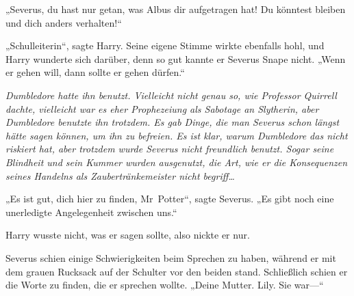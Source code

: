 „Severus, du hast nur getan, was Albus dir aufgetragen hat! Du könntest bleiben und dich anders verhalten!“

„Schulleiterin“, sagte Harry.
Seine eigene Stimme wirkte ebenfalls hohl, und Harry wunderte sich darüber, denn so gut kannte er Severus Snape nicht.
„Wenn er gehen will, dann sollte er gehen dürfen.“

\emph{Dumbledore hatte ihn benutzt. Vielleicht nicht genau so, wie Professor Quirrell dachte, vielleicht war es eher Prophezeiung als Sabotage an Slytherin, aber Dumbledore benutzte ihn trotzdem. Es gab Dinge, die man Severus schon längst hätte sagen können, um ihn zu befreien. Es ist klar, warum Dumbledore das nicht riskiert hat, aber trotzdem wurde Severus nicht freundlich benutzt. Sogar seine Blindheit und sein Kummer wurden ausgenutzt, die Art, wie er die Konsequenzen seines Handelns als Zaubertränkemeister nicht begriff…}

„Es ist gut, dich hier zu finden, Mr~Potter“, sagte Severus. „Es gibt noch eine unerledigte Angelegenheit zwischen uns.“

Harry wusste nicht, was er sagen sollte, also nickte er nur.

Severus schien einige Schwierigkeiten beim Sprechen zu haben, während er mit dem grauen Rucksack auf der Schulter vor den beiden stand. Schließlich schien er die Worte zu finden, die er sprechen wollte.
„Deine Mutter. Lily. Sie war—“

